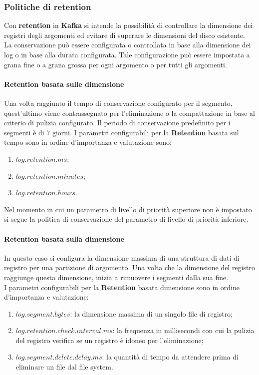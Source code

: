\subsubsection{Politiche di retention}
Con \textbf{retention} in \textbf{Kafka} si intende la possibilità di controllare la dimensione dei registri
degli argomenti ed evitare di superare le dimensioni del disco esistente.\\
La conservazione può essere configurata o controllata in base alla dimensione dei \gls{log}{} o in
base alla durata configurata. Tale configurazione può essere impostata a grana fine o a
grana grossa per ogni argomento o per tutti gli argomenti.
\paragraph{Retention basata sulle dimensione}
Una volta raggiunto il tempo di conservazione configurato per il segmento, quest'ultimo viene contrassegnato per l'eliminazione o la \gls{compattazione}{} in base al criterio di pulizia configurato. Il periodo di conservazione predefinito per i segmenti è di 7 giorni.
I parametri configurabili per la \textbf{Retention} basata sul tempo sono in ordine d'importanza e valutazione sono:
\begin{enumerate}
    \item $log.retention.ms$;
    \item $log.retention.minutes$;
    \item $log.retention.hours$.
\end{enumerate}
Nel momento in cui un parametro di livello di priorità superiore non è impostato si segue la politica di conservazione del parametro di livello di priorità inferiore.\\
\paragraph{Retention basata sulla dimensione}
In questo caso si  configura la dimensione massima di una struttura di dati di registro per una partizione di argomento. Una volta che la dimensione del registro raggiunge questa dimensione, inizia a rimuovere i segmenti dalla sua fine.\\

I parametri configurabili per la \textbf{Retention} basata dimensione sono in ordine d'importanza e valutazione:
\begin{enumerate}
    \item $log.segment.bytes$: la dimensione massima di un singolo file di registro;
    \item $log.retention.check.interval.ms$: la frequenza in millisecondi con cui la pulizia del registro verifica se un registro è idoneo per l'eliminazione;
    \item $log.segment.delete.delay.ms$: la quantità di tempo da attendere prima di eliminare un file dal file system.
\end{enumerate}

